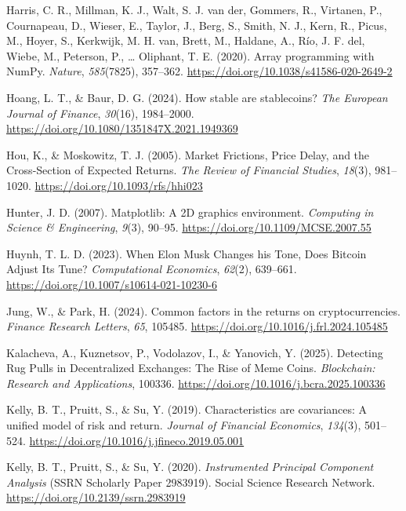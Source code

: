 \documentclass[
  12pt,
  a4paper,
  openany]{scrbook}
\newlength{\cslhangindent}
\newenvironment{CSLReferences}[2] %
 {\begin{list}{}{%
  \setlength{\itemindent}{0pt}
  \setlength{\leftmargin}{0pt}
  \setlength{\parsep}{0pt}
  \ifodd #1
   \setlength{\leftmargin}{\cslhangindent}
   \setlength{\itemindent}{-1\cslhangindent}
  \fi
  \setlength{\itemsep}{#2\baselineskip}}}
 {\end{list}}
\begin{document}
\begin{CSLReferences}{1}{0}
Harris, C. R., Millman, K. J., Walt, S. J. van der, Gommers, R.,
Virtanen, P., Cournapeau, D., Wieser, E., Taylor, J., Berg, S., Smith,
N. J., Kern, R., Picus, M., Hoyer, S., Kerkwijk, M. H. van, Brett, M.,
Haldane, A., Río, J. F. del, Wiebe, M., Peterson, P., \ldots{} Oliphant,
T. E. (2020). Array programming with {NumPy}. \emph{Nature},
\emph{585}(7825), 357--362.
\url{https://doi.org/10.1038/s41586-020-2649-2}

Hoang, L. T., \& Baur, D. G. (2024). How stable are stablecoins?
\emph{The European Journal of Finance}, \emph{30}(16), 1984--2000.
\url{https://doi.org/10.1080/1351847X.2021.1949369}

Hou, K., \& Moskowitz, T. J. (2005). Market Frictions, Price Delay, and
the Cross-Section of Expected Returns. \emph{The Review of Financial
Studies}, \emph{18}(3), 981--1020.
\url{https://doi.org/10.1093/rfs/hhi023}

Hunter, J. D. (2007). Matplotlib: A 2D graphics environment.
\emph{Computing in Science \& Engineering}, \emph{9}(3), 90--95.
\url{https://doi.org/10.1109/MCSE.2007.55}

Huynh, T. L. D. (2023). When Elon Musk Changes his Tone, Does Bitcoin
Adjust Its Tune? \emph{Computational Economics}, \emph{62}(2), 639--661.
\url{https://doi.org/10.1007/s10614-021-10230-6}

Jung, W., \& Park, H. (2024). Common factors in the returns on
cryptocurrencies. \emph{Finance Research Letters}, \emph{65}, 105485.
\url{https://doi.org/10.1016/j.frl.2024.105485}

Kalacheva, A., Kuznetsov, P., Vodolazov, I., \& Yanovich, Y. (2025).
Detecting Rug Pulls in Decentralized Exchanges: The Rise of Meme Coins.
\emph{Blockchain: Research and Applications}, 100336.
\url{https://doi.org/10.1016/j.bcra.2025.100336}

Kelly, B. T., Pruitt, S., \& Su, Y. (2019). Characteristics are
covariances: A unified model of risk and return. \emph{Journal of
Financial Economics}, \emph{134}(3), 501--524.
\url{https://doi.org/10.1016/j.jfineco.2019.05.001}

Kelly, B. T., Pruitt, S., \& Su, Y. (2020). \emph{Instrumented Principal
Component Analysis} (SSRN Scholarly Paper 2983919). Social Science
Research Network. \url{https://doi.org/10.2139/ssrn.2983919}


\end{CSLReferences}
\end{document}
